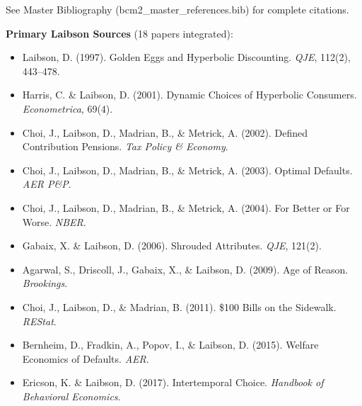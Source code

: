 See Master Bibliography (bcm2\_master\_references.bib) for complete citations.

\nocite{bcm_master}

\textbf{Primary Laibson Sources} (18 papers integrated):

\begin{itemize}
    \item Laibson, D. (1997). Golden Eggs and Hyperbolic Discounting. \textit{QJE}, 112(2), 443--478.
    \item Harris, C. \& Laibson, D. (2001). Dynamic Choices of Hyperbolic Consumers. \textit{Econometrica}, 69(4).
    \item Choi, J., Laibson, D., Madrian, B., \& Metrick, A. (2002). Defined Contribution Pensions. \textit{Tax Policy \& Economy}.
    \item Choi, J., Laibson, D., Madrian, B., \& Metrick, A. (2003). Optimal Defaults. \textit{AER P\&P}.
    \item Choi, J., Laibson, D., Madrian, B., \& Metrick, A. (2004). For Better or For Worse. \textit{NBER}.
    \item Gabaix, X. \& Laibson, D. (2006). Shrouded Attributes. \textit{QJE}, 121(2).
    \item Agarwal, S., Driscoll, J., Gabaix, X., \& Laibson, D. (2009). Age of Reason. \textit{Brookings}.
    \item Choi, J., Laibson, D., \& Madrian, B. (2011). \$100 Bills on the Sidewalk. \textit{REStat}.
    \item Bernheim, D., Fradkin, A., Popov, I., \& Laibson, D. (2015). Welfare Economics of Defaults. \textit{AER}.
    \item Ericson, K. \& Laibson, D. (2017). Intertemporal Choice. \textit{Handbook of Behavioral Economics}.
\end{itemize}


